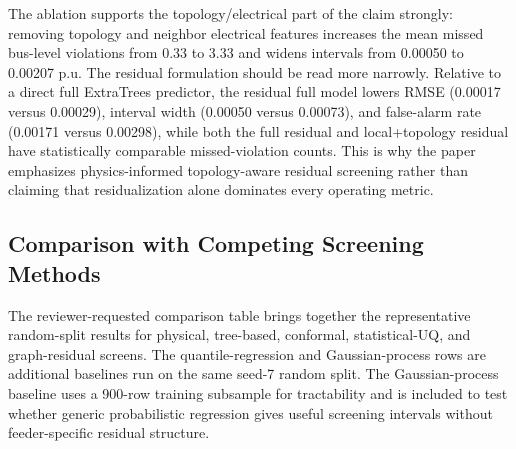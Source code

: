 \documentclass[
  preprint,12pt]{elsarticle}
\begin{document}
The ablation supports the topology/electrical part of the claim
strongly: removing topology and neighbor electrical features increases
the mean missed bus-level violations from 0.33 to 3.33 and widens
intervals from 0.00050 to 0.00207 p.u. The residual formulation should
be read more narrowly. Relative to a direct full ExtraTrees predictor,
the residual full model lowers RMSE (0.00017 versus 0.00029), interval
width (0.00050 versus 0.00073), and false-alarm rate (0.00171 versus
0.00298), while both the full residual and local+topology residual have
statistically comparable missed-violation counts. This is why the paper
emphasizes physics-informed topology-aware residual screening rather
than claiming that residualization alone dominates every operating
metric.

\subsection{Comparison with Competing Screening
Methods}\label{comparison-with-competing-screening-methods}

The reviewer-requested comparison table brings together the
representative random-split results for physical, tree-based, conformal,
statistical-UQ, and graph-residual screens. The quantile-regression and
Gaussian-process rows are additional baselines run on the same seed-7
random split. The Gaussian-process baseline uses a 900-row training
subsample for tractability and is included to test whether generic
probabilistic regression gives useful screening intervals without
feeder-specific residual structure.
\end{document}
